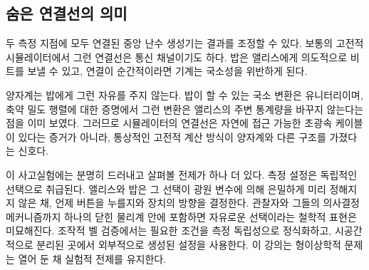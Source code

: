 \begin{classroomqa}
\end{classroomqa}

\subsection{숨은 연결선의 의미}

두 측정 지점에 모두 연결된 중앙 난수 생성기는 결과를 조정할 수 있다. 보통의 고전적 시뮬레이터에서 그런 연결선은 통신 채널이기도 하다. 밥은 앨리스에게 의도적으로 비트를 보낼 수 있고, 연결이 순간적이라면 기계는 국소성을 위반하게 된다.

양자계는 밥에게 그런 자유를 주지 않는다. 밥이 할 수 있는 국소 변환은 유니터리이며, 축약 밀도 행렬에 대한 증명에서 그런 변환은 앨리스의 주변 통계량을 바꾸지 않는다는 점을 이미 보였다. 그러므로 시뮬레이터의 연결선은 자연에 접근 가능한 초광속 케이블이 있다는 증거가 아니라, 통상적인 고전적 계산 방식이 양자계와 다른 구조를 가졌다는 신호다.

\begin{classroomqa}
\end{classroomqa}

\begin{classroomqa}
\end{classroomqa}

이 사고실험에는 분명히 드러내고 살펴볼 전제가 하나 더 있다. 측정 설정은 독립적인 선택으로 취급된다. 앨리스와 밥은 그 선택이 광원 변수에 의해 은밀하게 미리 정해지지 않은 채, 언제 버튼을 누를지와 장치의 방향을 결정한다. 관찰자와 그들의 의사결정 메커니즘까지 하나의 닫힌 물리계 안에 포함하면 자유로운 선택이라는 철학적 표현은 미묘해진다. 조작적 벨 검증에서는 필요한 조건을 측정 독립성으로 정식화하고, 시공간적으로 분리된 곳에서 외부적으로 생성된 설정을 사용한다. 이 강의는 형이상학적 문제는 열어 둔 채 실험적 전제를 유지한다.

